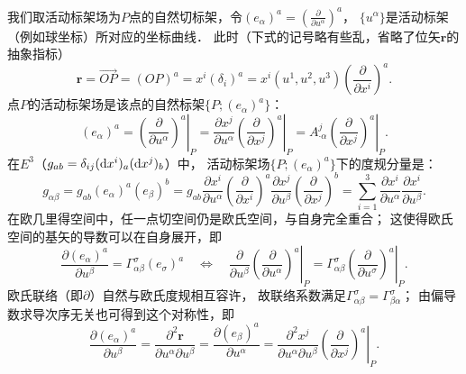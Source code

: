 我们取活动标架场为$P$点的自然切标架，令$(e_\alpha)^a= (\frac{\partial}{\partial u^\alpha})^a$，
$\{u^\alpha\}$是活动标架（例如球坐标）所对应的坐标曲线．
此时（下式的记号略有些乱，省略了位矢$\boldsymbol{r}$的抽象指标）
\begin{equation}
    \boldsymbol{r}=\overrightarrow{OP}= (OP)^a = x^i (\delta_i)^a 
    = x^i(u^1,u^2,u^3) \left(\frac{\partial}{\partial x^i}\right)^a .
\end{equation}
点$P$的活动标架场是该点的自然标架$\{P;(e_\alpha)^a\}$：
\begin{equation}
    (e_\alpha)^a = \left.\left(\frac{\partial}{\partial u^\alpha}\right)^a\right|_{P}
    =\frac{\partial x^j}{\partial u^\alpha}
    \left.\left(\frac{\partial}{\partial x^j}\right)^a \right|_{P}
    =A^j_{\cdot \alpha} \left.\left(\frac{\partial}{\partial x^j}\right)^a\right|_{P} .
\end{equation}
在$E^3$（$g_{ab}=\delta_{ij}({\rm d}x^i)_a ({\rm d}x^j)_b$）中，
活动标架场$\{P;(e_\alpha)^a\}$下的度规分量是：
\begin{equation}\label{chrg:eqn_gabEuclid}
    g_{\alpha\beta}= g_{ab}(e_\alpha)^a (e_\beta)^b
    =g_{ab} \frac{\partial x^i}{\partial u^\alpha} \left(\frac{\partial}{\partial x^i}\right)^a
    \frac{\partial x^j}{\partial u^\beta} \left(\frac{\partial}{\partial x^j}\right)^b
    = \sum_{i=1}^{3}\frac{\partial x^i}{\partial u^\alpha}\frac{\partial x^i}{\partial u^\beta} .
\end{equation}
在欧几里得空间中，任一点切空间仍是欧氏空间，与自身完全重合；
这使得欧氏空间的基矢的导数可以在自身展开，即
\begin{equation}\label{chrg:eqn_tmpr23}
    \frac{\partial (e_\alpha)^a }{\partial u^\beta} = \Gamma^\sigma_{\alpha\beta} (e_\sigma)^a  
    \quad \Leftrightarrow \quad
    \frac{\partial }{\partial u^\beta} \left.\left(\frac{\partial}{\partial u^\alpha}\right)^a\right|_{P}
    = \Gamma^\sigma_{\alpha\beta} \left.\left(\frac{\partial}{\partial u^\sigma}\right)^a \right|_{P}.
\end{equation}
欧氏联络（即$\partial$）自然与欧氏度规相互容许，
故联络系数满足$\Gamma^\sigma_{\alpha\beta}=\Gamma^\sigma_{\beta\alpha}$；
由偏导数求导次序无关也可得到这个对称性，即
\begin{equation}\label{chrg:eqn_tmpra32}
    \frac{\partial (e_\alpha)^a }{\partial u^\beta}
    =\frac{\partial^2 \boldsymbol{r}}{\partial u^\alpha \partial u^\beta}
    =\frac{\partial (e_\beta)^a }{\partial u^\alpha}
    =\frac{\partial^2 x^j}{\partial u^\alpha\partial u^\beta}
    \left. \left(\frac{\partial}{\partial x^j}\right)^a \right|_{P}.
\end{equation}
